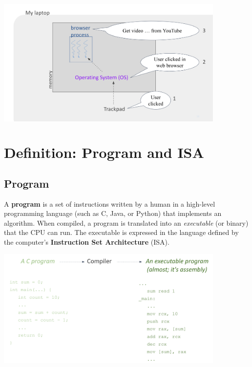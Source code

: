 \begin{center}
  \includegraphics[width=0.85\textwidth]{chapters/L1/images/os_youtube.png}
\end{center}

\newpage
\section{Definition: Program and ISA}

\subsection{Program}
A \textbf{program} is a set of instructions written by a human in a high-level programming language (such as C, Java, or Python) that implements an algorithm. When compiled, a program is translated into an \emph{executable} (or binary) that the CPU can run. The executable is expressed in the language defined by the computer's \textbf{Instruction Set Architecture} (ISA).

\begin{center}
  \includegraphics[width=0.85\textwidth]{chapters/L1/images/program.png}
\end{center}

